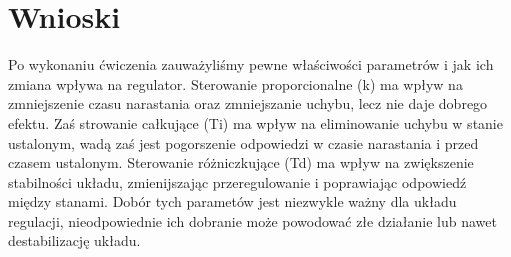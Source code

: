 \documentclass[a4paper,10pt]{article}
\begin{document}
\section{Wnioski}
Po wykonaniu ćwiczenia zauważyliśmy pewne właściwości parametrów i jak ich zmiana wpływa na regulator. Sterowanie proporcionalne (k) ma wpływ na zmniejszenie czasu narastania oraz zmniejszanie uchybu, lecz nie daje dobrego efektu.
Zaś strowanie całkujące (Ti) ma wpływ na eliminowanie uchybu w stanie ustalonym, wadą zaś jest pogorszenie odpowiedzi w czasie narastania i przed czasem ustalonym. Sterowanie różniczkujące (Td) ma wpływ na zwiększenie stabilności układu, zmienijszając przeregulowanie i poprawiając odpowiedź między stanami. Dobór tych parametów jest niezwykle ważny dla układu regulacji, nieodpowiednie ich dobranie może powodować złe działanie lub nawet destabilizację układu.
\end{document}

